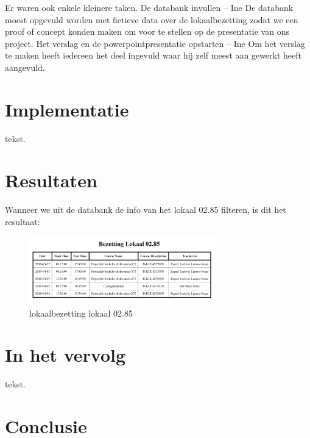 \documentclass[a4paper,kul]{kulakarticle} %
\begin{document}
\newline
\newline
Er waren ook enkele kleinere taken.
\newline
\newline
De databank invullen – Ine
\newline
De databank moest opgevuld worden met fictieve data over de lokaalbezetting zodat we een proof of concept konden maken om voor te stellen op de presentatie van ons project.
\newline
\newline
Het verslag en de powerpointpresentatie opstarten – Ine 
\newline
Om het verslag te maken heeft iedereen het deel ingevuld waar hij zelf meest aan gewerkt heeft aangevuld. 

\newpage

\section{Implementatie}

tekst.

\newpage

\section{Resultaten}

Wanneer we uit de databank de info van het lokaal 02.85 filteren, is dit het resultaat:

\begin{figure}[h!]
	\centering
	\includegraphics[width=0.75\textwidth]{vbDatabank}
	\caption{lokaalbezetting lokaal 02.85}
	\label{lokaalbezetting 02.85}
\end{figure}

\newpage

\section{In het vervolg}

tekst.

\newpage

\section{Conclusie}
\end{document}
